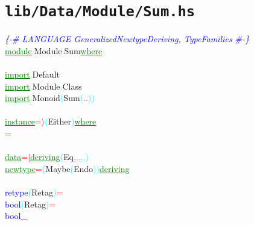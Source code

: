 \section{\texttt{lib/Data/Module/Sum.hs}}
\label{mod:Data.Module.Sum}
\textcolor{blue}{{\it{}\{-\# LANGUAGE GeneralizedNewtypeDeriving, TypeFamilies \#-\}}}\\\textcolor{green}{\underline{module}}\textcolor{cyan}{.}{\rm{}Module}\textcolor{cyan}{.}{\rm{}Sum}\hsspace \textcolor{green}{\underline{where}}\\\\\textcolor{green}{\underline{import}}\textcolor{cyan}{.}{\rm{}Default}\\\textcolor{green}{\underline{import}}\textcolor{cyan}{.}{\rm{}Module}\textcolor{cyan}{.}{\rm{}Class}\\\textcolor{green}{\underline{import}}\textcolor{cyan}{.}{\rm{}Monoid}\hsspace \textcolor{cyan}{(}{\rm{}Sum}\textcolor{cyan}{(}\textcolor{red}{..}\textcolor{cyan}{)}\textcolor{cyan}{)}\\\\\textcolor{green}{\underline{instance}}\hsspace \textcolor{red}{=\ensuremath{\rangle}}\hsspace \textcolor{cyan}{(}{\rm{}Either}\textcolor{cyan}{)}\hsspace \textcolor{green}{\underline{where}}\\\hsspace \textcolor{red}{=}\\\\\textcolor{green}{\underline{data}}\hsspace \textcolor{red}{=}\hsspace \textcolor{red}{\ensuremath{|}}\hsspace \textcolor{green}{\underline{deriving}}\hsspace \textcolor{cyan}{(}{\rm{}Eq}\textcolor{cyan}{,}\textcolor{cyan}{,}\textcolor{cyan}{,}\textcolor{cyan}{,}\textcolor{cyan}{,}\textcolor{cyan}{)}\\\textcolor{green}{\underline{newtype}}\hsspace \textcolor{red}{=}\hsspace \textcolor{cyan}{(}{\rm{}Maybe}\hsspace \textcolor{cyan}{(}{\rm{}Endo}\textcolor{cyan}{)}\textcolor{cyan}{)}\hsspace \textcolor{green}{\underline{deriving}}\\\\\textcolor{blue}{retype}\hsspace \textcolor{cyan}{(}{\rm{}Retag}\textcolor{cyan}{)}\hsspace \textcolor{red}{=}\\\textcolor{blue}{bool}\hsspace \textcolor{cyan}{(}{\rm{}Retag}\textcolor{cyan}{)}\hsspace \textcolor{red}{=}\\\textcolor{blue}{bool}\hsspace \textcolor{green}{\underline{\_}}\hsspace \hsspace \hsspace \hsspace \hsspace \hsspace \hsspace \hsspace \hsspace \hsspace \hsspace \hsspace \hsspace \hsspace 
